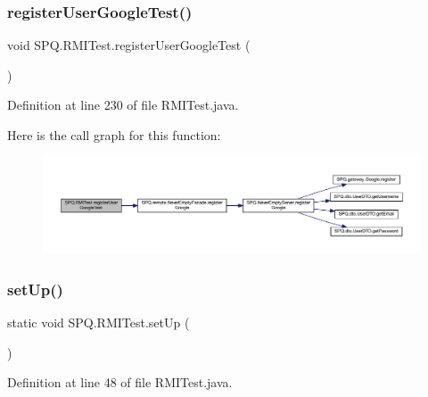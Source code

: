 \subsubsection{\texorpdfstring{register\+User\+Google\+Test()}{registerUserGoogleTest()}}
{\footnotesize\ttfamily void S\+P\+Q.\+R\+M\+I\+Test.\+register\+User\+Google\+Test (\begin{DoxyParamCaption}{ }\end{DoxyParamCaption})}



Definition at line 230 of file R\+M\+I\+Test.\+java.

Here is the call graph for this function\+:
\nopagebreak
\begin{figure}[H]
\begin{center}
\leavevmode
\includegraphics[width=350pt]{class_s_p_q_1_1_r_m_i_test_a18c26a1a1882c74b0ff9a0142c9492c8_cgraph}
\end{center}
\end{figure}
\mbox{\label{class_s_p_q_1_1_r_m_i_test_ab314266e24b54a7e2f482a3a0b48edaf}} 
\subsubsection{\texorpdfstring{set\+Up()}{setUp()}}
{\footnotesize\ttfamily static void S\+P\+Q.\+R\+M\+I\+Test.\+set\+Up (\begin{DoxyParamCaption}{ }\end{DoxyParamCaption})\hspace{0.3cm}{\ttfamily [static]}}



Definition at line 48 of file R\+M\+I\+Test.\+java.

\mbox{\label{class_s_p_q_1_1_r_m_i_test_a7ec13d55d5cb3716468c3e9d7b5740d3}} 
